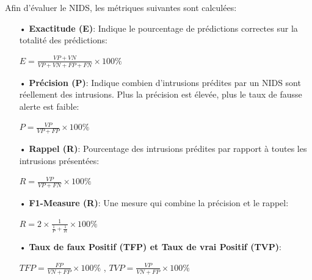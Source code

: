 Afin d'évaluer le NIDS, les métriques suivantes sont calculées:\\
\begin{itemize}
	\item[•] \textbf{Exactitude (E)}: Indique le pourcentage de prédictions correctes sur la totalité des prédictions:
	\begin{large}
		\begin{center}
			$ E = \frac{VP + VN}{ VP + VN + FP + FN} \times 100\% $
		\end{center}
	\end{large}
	
	\hfill
	
	\item[•] \textbf{Précision (P)}: Indique combien d’intrusions prédites par un NIDS sont réellement des intrusions. Plus la précision est élevée, plus le taux de fausse alerte est faible:
	\begin{large}
		\begin{center}
			$ P = \frac{VP}{ VP + FP} \times 100\%$
		\end{center}
	\end{large}
	
	\hfill
	
	\item[•] \textbf{Rappel (R)}: Pourcentage des intrusions prédites par rapport à toutes les intrusions présentées:
	\begin{large}
		\begin{center}
			$ R = \frac{VP}{ VP + FN} \times 100\%$
		\end{center}
	\end{large}
	
	\hfill
	
	\item[•] \textbf{F1-Measure (R)}: Une mesure qui combine la précision et le rappel:\\
	\begin{large}
		\begin{center}
			$ R = 2 \times \frac{1}{ \frac{1}{P} + \frac{1}{R}} \times 100\%$
		\end{center}
	\end{large}
	
	\hfill
	
	\item[•] \textbf{Taux de faux Positif (TFP) et Taux de vrai Positif (TVP)}:\\
	\begin{large}
		\begin{center}
			$ TFP = \frac{FP}{ VN + FP} \times 100\%$ , $ TVP = \frac{VP}{ VN + FP} \times 100\%$ 
		\end{center}
	\end{large}
\end{itemize}


